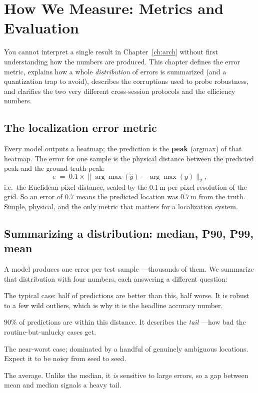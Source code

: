 \chapter{How We Measure: Metrics and Evaluation}
\label{ch:eval}

You cannot interpret a single result in Chapter~\ref{ch:arch} without first understanding how the
numbers are produced. This chapter defines the error metric, explains how a whole \emph{distribution}
of errors is summarized (and a quantization trap to avoid), describes the corruptions used to probe
robustness, and clarifies the two very different cross-session protocols and the efficiency numbers.

\section{The localization error metric}
\label{sec:eval:error}

Every model outputs a heatmap; the prediction is the \textbf{peak} (argmax) of that heatmap. The error
for one sample is the physical distance between the predicted peak and the ground-truth peak:
\[
  e \;=\; 0.1 \times \big\lVert \arg\max(\hat{y}) - \arg\max(y) \big\rVert_2 ,
\]
i.e.\ the Euclidean pixel distance, scaled by the $0.1$\,m-per-pixel resolution of the grid. So an
error of $0.7$ means the predicted location was $0.7$\,m from the truth. Simple, physical, and the
only metric that matters for a localization system.

\section{Summarizing a distribution: median, P90, P99, mean}
\label{sec:eval:stats}

A model produces one error per test sample ---thousands of them. We summarize that distribution with
four numbers, each answering a different question:
\begin{description}[leftmargin=1.6cm,style=nextline,nosep]
  \item[Median] The typical case: half of predictions are better than this, half worse. It is robust
  to a few wild outliers, which is why it is the headline accuracy number.
  \item[P90 (90th percentile)] $90\%$ of predictions are within this distance. It describes the
  \emph{tail} ---how bad the routine-but-unlucky cases get.
  \item[P99 (99th percentile)] The near-worst case; dominated by a handful of genuinely ambiguous
  locations. Expect it to be noisy from seed to seed.
  \item[Mean] The average. Unlike the median, it \emph{is} sensitive to large errors, so a gap between
  mean and median signals a heavy tail.
\end{description}

